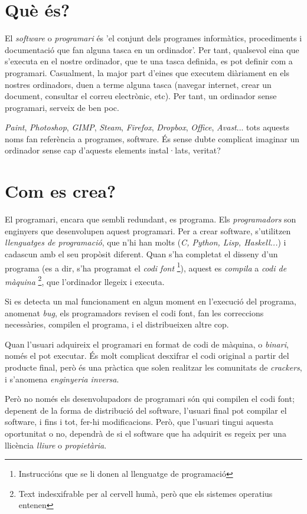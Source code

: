 \section{Què és?}
El \emph{software} o \emph{programari} és 'el conjunt dels programes informàtics, procediments i documentació que fan alguna tasca en un ordinador'. Per tant, qualsevol eina que s'executa en el nostre ordinador, que te una tasca definida, es pot definir com a programari. Casualment, la major part d'eines que executem diàriament en els nostres ordinadors, duen a terme alguna tasca
(navegar internet, crear un document, consultar el correu electrònic, etc). Per tant, un ordinador sense programari, serveix de ben poc.

\emph{Paint}, \emph{Photoshop}, \emph{GIMP}, \emph{Steam}, \emph{Firefox}, \emph{Dropbox}, \emph{Office}, \emph{Avast}... tots aquests noms fan referència a programes, software. És 
sense dubte complicat imaginar un ordinador sense cap d'aquests elements instal·lats, veritat?

\section{Com es crea?}
El programari, encara que sembli redundant, es programa. Els \emph{programadors}
son enginyers que desenvolupen aquest programari. Per a crear software, s'utilitzen
\emph{llenguatges de programació}, que n'hi han molts (\emph{C, Python, Lisp, Haskell...})
i cadascun amb el seu propòsit diferent. Quan s'ha completat el disseny d'un programa
(es a dir, s'ha programat el \emph{codi font} \footnote{Instruccións que se li donen al
llenguatge de programació}), aquest es \emph{compila} a \emph{codi de màquina} \footnote{Text indesxifrable per al cervell humà, però que els sistemes operatius entenen}, que l'ordinador llegeix i executa.

Si es detecta un mal funcionament en algun moment en l'execució del programa, anomenat \emph{bug}, els
programadors revisen el codi font, fan les correccions necessàries, compilen el programa,
i el distribueixen altre cop.

Quan l'usuari adquireix el programari en format de codi de màquina, o \emph{binari}, només el pot
executar. És molt complicat desxifrar el codi original a partir del producte final, però és una
pràctica que solen realitzar les comunitats de \emph{crackers}, i s'anomena \emph{enginyeria inversa}.

Però no només els desenvolupadors de programari són qui compilen el codi font; depenent de la forma
de distribució del software, l'usuari final pot compilar el software, i fins i tot, fer-hi modificacions. Però, que l'usuari tingui aquesta oportunitat o no,  dependrà de si el software que ha adquirit es regeix per una llicència \emph{lliure} o \emph{propietària}.

